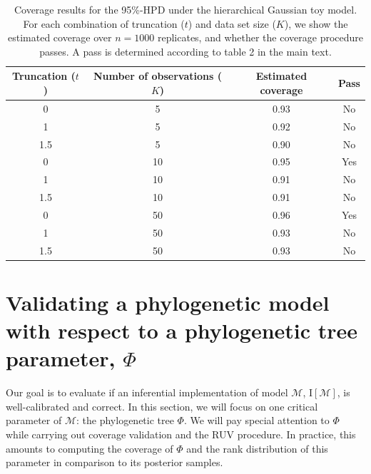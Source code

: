 \documentclass[oneside]{article}
\begin{document}
\begin{table}[!h]
\caption{Coverage results for the 95\%-HPD under the hierarchical Gaussian toy model.
For each combination of truncation ($t$) and data set size ($K$), we show the estimated coverage over $n=1000$ replicates, and whether the coverage procedure passes.
A pass is determined according to table 2 in the main text.
}
\centering
\begin{tabular}{cccc}
  \hline
  Truncation ($t$) & Number of observations ($K$) & Estimated coverage & Pass \\
  \hline
  \rowcolor{gray!10} 0   & 5                      & 0.93               & No     \\
  \rowcolor{gray!10} 1   & 5                      & 0.92               & No     \\
  \rowcolor{gray!10} 1.5 & 5                      & 0.90               & No     \\
                     0   & 10                     & 0.95               & Yes    \\
                     1   & 10                     & 0.91               & No     \\
                     1.5 & 10                     & 0.91               & No     \\
  \rowcolor{gray!10} 0   & 50                     & 0.96               & Yes    \\
  \rowcolor{gray!10} 1   & 50                     & 0.93               & No     \\
  \rowcolor{gray!10} 1.5 & 50                     & 0.93               & No     \\
  \hline
\end{tabular}
\end{table}

\newpage
\section{Validating a phylogenetic model with respect to a phylogenetic tree parameter, $\Phi$}
\label{sec::app::ruv_topology}

Our goal is to evaluate if an inferential implementation of model $\mathcal{M}$, $\text{I}[\mathcal{M}]$, is well-calibrated and correct.
In this section, we will focus on one critical parameter of $\mathcal{M}$: the phylogenetic tree $\Phi$.
We will pay special attention to $\Phi$ while carrying out coverage validation and the RUV procedure.
In practice, this amounts to computing the coverage of $\Phi$ and the rank distribution of this parameter in comparison to its posterior samples.
\end{document}

